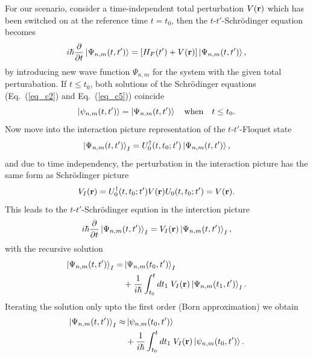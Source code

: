 For our scenario, consider a time-independent total perturbation $V(\vb{r})$ which has been switched on at the reference time $t=t_0$, then the $t$-$t'$-Schrödinger equation becomes
\begin{equation} \label{eq_c5}
  i \hbar \pdv{t}\ket{\Psi_{n,m}(t,t')} =
  \qty[H_F(t') + V(\vb{r})]\ket{\Psi_{n,m}(t,t')},
\end{equation}
by introducing new wave function $\Psi_{n,m}$ for the system with the given total perturabation. If $t\leq t_0$, both solutions of the Schrödinger equations (Eq.~(\ref{eq_c2}) and Eq.~(\ref{eq_c5})) coincide
\begin{equation} \label{eq_c6}
  \ket{\psi_{n,m}(t,t')} =\ket{\Psi_{n,m}(t,t')} \quad
  \text{when} \quad
  t \leq t_0.
\end{equation}
Now move into the interaction picture representation \cite{bruus04,mahan00} of the $t$-$t'$-Floquet state
\begin{equation} \label{eq_c7}
  \ket{\Psi_{n,m}(t,t')}_I = U_0^{\dagger}(t,t_0;t')
  \ket{\Psi_{n,m}(t,t')},
\end{equation}
and due to time independency, the perturbation in the interaction picture has the same form as Schrödinger picture
\begin{equation} \label{eq_c8}
  V_I(\vb{r}) = U_0^{\dagger}(t,t_0;t')V(\vb{r})U_0(t,t_0;t') =
  V(\vb{r}).
\end{equation}
This leads to the $t$-$t'$-Schrödinger eqution in the interction picture
\begin{equation} \label{eq_c9}
  i \hbar \pdv{t}\ket{\Psi_{n,m}(t,t')}_I =
  V_I(\vb{r})\ket{\Psi_{n,m}(t,t')}_I,
\end{equation}
with the recursive solution \cite{bruus04,mahan00}
\begin{equation} \label{eq_c10}
  \begin{aligned}
  \ket{\Psi_{n,m}(t,t')}_I = &\ket{\Psi_{n,m}(t_0,t')}_I \\
  &+
  \frac{1}{i\hbar}
  \int_{t_0}^t dt_1 \;
  V_I(\vb{r}) \ket{\Psi_{n,m}(t_1,t')}_I.
  \end{aligned}
\end{equation}
Iterating the solution only upto the first order (Born approximation) we obtain
\begin{equation} \label{eq_c11}
  \begin{aligned}
    \ket{\Psi_{n,m}(t,t')}_I \approx &\ket{\psi_{n,m}(t_0,t')} \\
    &+
    \frac{1}{i\hbar}
    \int_{t_0}^t dt_1 \;
    V_I(\vb{r}) \ket{\psi_{n,m}(t_0,t')}.
  \end{aligned}
\end{equation}

